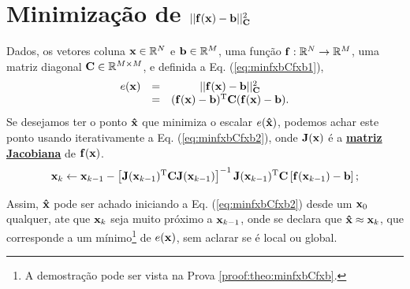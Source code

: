 \section{Minimização de $||\VECTOR{f}(\VECTOR{x})-\VECTOR{b}||_{\MATRIX{C}}^2$}




\begin{theorem}\label{theo:minfxbCfxb}
Dados,
os vetores coluna $\VECTOR{x}\in \mathbb{R}^N$ e $\VECTOR{b}\in \mathbb{R}^M$,  
uma função $\VECTOR{f}:\mathbb{R}^{N} \rightarrow \mathbb{R}^{M}$, 
uma matriz diagonal $\MATRIX{C} \in \mathbb{R}^{M\times M}$, e 
definida a Eq. (\ref{eq:minfxbCfxb1}),
\begin{equation}\label{eq:minfxbCfxb1}
\begin{matrix}
e(\VECTOR{x}) & = & ||\VECTOR{f}(\VECTOR{x})-\VECTOR{b}||_{\MATRIX{C}}^2 \\
              & = & (\VECTOR{f}(\VECTOR{x})-\VECTOR{b})^{\transpose}\MATRIX{C}(\VECTOR{f}(\VECTOR{x})-\VECTOR{b}).
\end{matrix}
\end{equation}
Se desejamos ter o ponto $\VECTOR{\hat{x}}$ que minimiza o escalar $e(\VECTOR{\hat{x}})$,
podemos achar este ponto usando iterativamente a Eq. (\ref{eq:minfxbCfxb2}),
onde  $\MATRIX{J}(\VECTOR{x})$ é a \hyperref[def:jacobian]{\textbf{matriz Jacobiana}}  de $\VECTOR{f}(\VECTOR{x})$.
\begin{equation}\label{eq:minfxbCfxb2}
\VECTOR{x}_{k} \leftarrow \VECTOR{x}_{k-1}-
\left[ \MATRIX{J}(\VECTOR{x}_{k-1})^{\transpose}\MATRIX{C} \MATRIX{J}(\VECTOR{x}_{k-1}) \right]^{-1}
 \MATRIX{J}(\VECTOR{x}_{k-1})^{\transpose}\MATRIX{C}\left[\VECTOR{f}(\VECTOR{x}_{k-1})-\VECTOR{b}\right];
\end{equation}



Assim, $\VECTOR{\hat{x}}$ pode ser achado 
iniciando a Eq. (\ref{eq:minfxbCfxb2}) desde um $\VECTOR{x}_{0}$ qualquer, 
ate que $\VECTOR{x}_{k}$ seja muito próximo a $\VECTOR{x}_{k-1}$,
onde se declara que $\VECTOR{\hat{x}} \approx \VECTOR{x}_{k}$,
que corresponde a um mínimo\footnote{\label{ref:minfx}A
demostração pode ser vista na Prova \ref{proof:theo:minfxbCfxb}.} de $e(\VECTOR{x})$,
sem aclarar se é local ou global.


\end{theorem}
